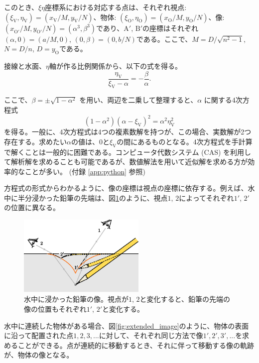 \documentclass[twocolumn]{article}
\begin{document}
このとき、$\xi\eta$座標系における対応する点は、それぞれ視点: $(\xi_{\mathrm{V}}^{}, \eta_{\mathrm{V}}^{})=(x_{\mathrm{V}}^{}/M, y_{\mathrm{V}}^{}/N)$、物体: $(\xi_{\mathrm{O}}^{}, \eta_{\mathrm{O}}^{})=(x_{\mathrm{O}}^{}/M, y_{\mathrm{O}}^{}/N)$、像: $(x_{\mathrm{O'}}^{}/M, y_{\mathrm{O'}}^{}/N)=(\alpha^3, \beta^3)$であり、$\mathrm{A'}$, $\mathrm{B'}$の座標はそれぞれ$(\alpha, 0) = (a/M, 0)$, $(0, \beta) = (0, b/N)$である。ここで、$M=D/\sqrt{n^2-1}$, $N=D/n$, $D=y_{\mathrm{O}}^{}$である。

接線と水面、$\eta$軸が作る比例関係から、以下の式を得る。
$$\dfrac{\eta_{\mathrm{V}}^{}}{\xi_{\mathrm{V}}^{}-\alpha}=-\dfrac{\beta}{\alpha}.$$

ここで、$\beta = \pm \sqrt{1-\alpha^2}$ を用い、両辺を二乗して整理すると、$\alpha$ に関する4次方程式
\[
\left( 1 - \alpha^2 \right) \left(\alpha-\xi_{\mathrm{V}} \right)^2 = \alpha^2 \eta_{\mathrm{V}}^2
\]
を得る。一般に、4次方程式は4つの複素数解を持つが、この場合、実数解が2つ存在する。求めたい$\alpha$の値は、0と$\xi_{\mathrm{V}}$の間にあるものとなる。4次方程式を手計算で解くことは一般的に困難である。コンピュータ代数システム (CAS) を利用して解析解を求めることも可能であるが、数値解法を用いて近似解を求める方が効率的なことが多い。 (付録 \ref{app:python} 参照)

方程式の形式からわかるように、像の座標は視点の座標に依存する。例えば、水中に半分浸かった鉛筆の先端は、図\ref{fig:pencil_view}のように、視点$1$, $2$によってそれぞれ$1'$, $2'$の位置に異なる。
	
\begin{figure}[h]
	\centering
	\includegraphics[width=2.4in]{figs/g43.eps}
	\caption{水中に浸かった鉛筆の像。視点が$1$, $2$と変化すると、鉛筆の先端の像の位置もそれぞれ$1'$, $2'$と変化する。}
	\label{fig:pencil_view}
\end{figure}

水中に連続した物体がある場合、図\ref{fig:extended_image}のように、物体の表面に沿って配置された点$1, 2, 3, ...$に対して、それぞれ同じ方法で像$1', 2', 3', ...$を求めることができる。点が連続的に移動するとき、それに伴って移動する像の軌跡が、物体の像となる。
\end{document}
